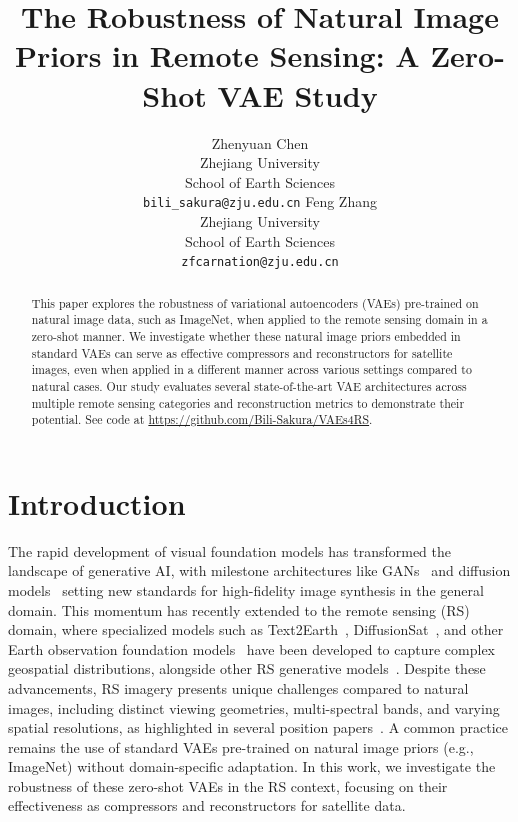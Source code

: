\documentclass{article} %
\title{The Robustness of Natural Image Priors in Remote Sensing: A Zero-Shot VAE Study}
\author{
Zhenyuan Chen\\
Zhejiang University\\
School of Earth Sciences\\
\texttt{bili\_sakura@zju.edu.cn}
\And
Feng Zhang\\
Zhejiang University\\
School of Earth Sciences\\
\texttt{zfcarnation@zju.edu.cn}
}
\begin{document}
\fancyhead[L]{}

\maketitle
\fancyhead[L]{}
\thispagestyle{fancy}

\begin{abstract}
This paper explores the robustness of variational autoencoders (VAEs) pre-trained on natural image data, such as ImageNet, when applied to the remote sensing domain in a zero-shot manner. We investigate whether these natural image priors embedded in standard VAEs can serve as effective compressors and reconstructors for satellite images, even when applied in a different manner across various settings compared to natural cases. Our study evaluates several state-of-the-art VAE architectures across multiple remote sensing categories and reconstruction metrics to demonstrate their potential. See code at \url{https://github.com/Bili-Sakura/VAEs4RS}.
\end{abstract}

\section{Introduction}

The rapid development of visual foundation models has transformed the landscape of generative AI, with milestone architectures like GANs~\citep{goodfellow2014generative, karras2018progressive, brock2018large, karras2020analyzing, sauer2022stylegan} and diffusion models~\citep{ho2020denoising, song2020denoising, song2021scorebased, dhariwal2021diffusion, karras2022edm, lu2022dpm, rombachHighResolutionImageSynthesis2022} setting new standards for high-fidelity image synthesis in the general domain. This momentum has recently extended to the remote sensing (RS) domain, where specialized models such as Text2Earth~\citep{chenText2EarthTexttoRemoteSensing2024}, DiffusionSat~\citep{khannaDiffusionSatGenerativeFoundation2024}, and other Earth observation foundation models~\citep{luVisionFoundationModels2025, tuiaArtificialIntelligenceAdvance2025} have been developed to capture complex geospatial distributions, alongside other RS generative models~\citep{yellapragadaZoomLDMLatentDiffusion2025,yuMetaEarthGenerativeFoundation2025,pangHSIGeneFoundationModel2026,sastryGeoSynthContextuallyAwareHighResolution2024,panEarthSynthGeneratingInformative2025,sebaqRSDiffRemoteSensing2024}. Despite these advancements, RS imagery presents unique challenges compared to natural images, including distinct viewing geometries, multi-spectral bands, and varying spatial resolutions, as highlighted in several position papers~\citep{rolfPositionMissionCritical2024}. A common practice remains the use of standard VAEs pre-trained on natural image priors (e.g., ImageNet) without domain-specific adaptation. In this work, we investigate the robustness of these zero-shot VAEs in the RS context, focusing on their effectiveness as compressors and reconstructors for satellite data.
\end{document}
